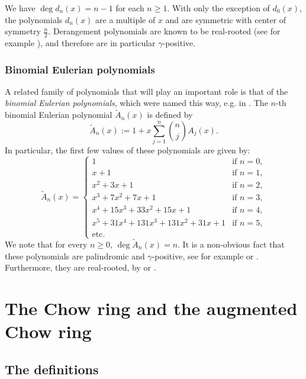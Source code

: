 \documentclass[11pt, a4paper, english]{amsart}
\theoremstyle{teoremas}
\theoremstyle{definition}
\begin{document}
We have $\deg d_n(x) = n-1$ for each $n\geq 1$. With only the exception of $d_0(x)$, the polynomials $d_n(x)$ are a multiple of $x$ and are symmetric with center of symmetry $\frac{n}{2}$.  Derangement polynomials are known to be real-rooted (see for example \cite[Theorems 3.5 and 4.1]{gustafsson-solus}), and therefore are in particular $\gamma$-positive.

\subsubsection{Binomial Eulerian polynomials}

A related family of polynomials that will play an important role is that of the \emph{binomial Eulerian polynomials}, which were named this way, e.g. in \cite{shareshian-wachs,athanasiadis-eulerian}. The $n$-th binomial Eulerian polynomial $\widetilde{A}_n(x)$ is defined by
    \[ \widetilde{A}_n(x) := 1 + x \sum_{j=1}^{n} \binom{n}{j} A_j(x).\]
In particular, the first few values of these polynomials are given by:
    \[ \widetilde{A}_n(x) = \begin{cases}
        1 & \text{if } n = 0,\\
        x+1 & \text{if } n = 1,\\
        x^2+3x+1 & \text{if } n=2,\\
        x^3+7x^2+7x+1 & \text{if } n=3,\\
        x^4+15x^3+33x^2+15x+1 & \text{if } n=4,\\
        x^5+31x^4+131x^3+131x^2+31x+1 & \text{if } n=5,\\
        \text{etc.} &
    \end{cases}\]
We note that for every $n\geq 0$, $\deg\widetilde{A}_n(x)=n$. It is a non-obvious fact that these polynomials are palindromic and $\gamma$-positive, see for example \cite[Theorem~11.6]{postnikov-reiner-williams} or \cite[Theorem~1.1]{athanasiadis-eulerian}. Furthermore, they are real-rooted, by \cite[Theorem~3.1]{haglund-zhang} or \cite[Theorem 4.4]{branden-jochemko}. 



\section{The Chow ring and the augmented Chow ring}\label{sec:three}

\subsection{The definitions}
\end{document}
